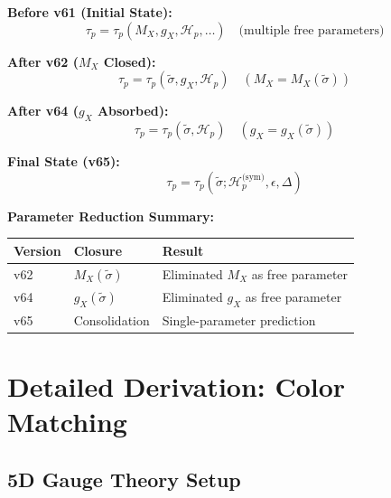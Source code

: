 \documentclass[11pt,a4paper]{article}
\theoremstyle{definition}
\begin{document}
\begin{closurebox}
\textbf{Before v61 (Initial State):}
\begin{equation}
\label{eq:before-v61}
\tau_p = \tau_p(M_X, g_X, \mathcal{H}_p, \ldots) \quad \text{(multiple free parameters)}
\end{equation}

\textbf{After v62 ($M_X$ Closed):}
\begin{equation}
\label{eq:after-v62}
\tau_p = \tau_p(\tilde{\sigma}, g_X, \mathcal{H}_p) \quad (M_X = M_X(\tilde{\sigma}))
\end{equation}

\textbf{After v64 ($g_X$ Absorbed):}
\begin{equation}
\label{eq:after-v64}
\tau_p = \tau_p(\tilde{\sigma}, \mathcal{H}_p) \quad (g_X = g_X(\tilde{\sigma}))
\end{equation}

\textbf{Final State (v65):}
\begin{equation}
\label{eq:final-state}
\boxed{\tau_p = \tau_p(\tilde{\sigma}; \mathcal{H}_p^{\text{(sym)}}, \epsilon, \Delta)}
\end{equation}

\textbf{Parameter Reduction Summary:}
\begin{center}
\begin{tabular}{lll}
\toprule
Version & Closure & Result \\
\midrule
v62 & $M_X(\tilde{\sigma})$ & Eliminated $M_X$ as free parameter \\
v64 & $g_X(\tilde{\sigma})$ & Eliminated $g_X$ as free parameter \\
v65 & Consolidation & Single-parameter prediction \\
\bottomrule
\end{tabular}
\end{center}
\end{closurebox}

\appendix

\section{Detailed Derivation: Color Matching}
\label{app:color-matching}

\subsection{5D Gauge Theory Setup}
\label{app:5d-setup}
\end{document}
